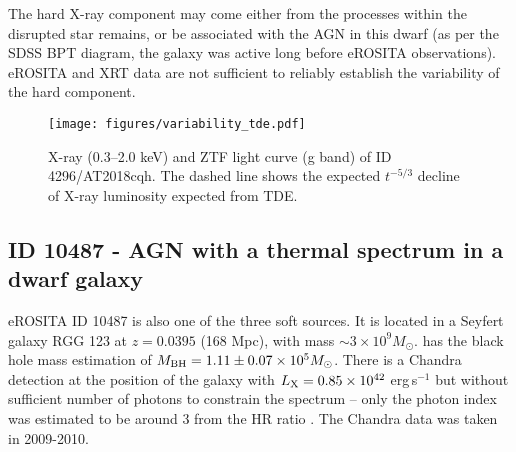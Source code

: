 \documentclass[fleqn,usenatbib]{mnras}
\newcommand{\ergps}{erg\,s$^{-1}$}
\newcommand{\msun}{M_\odot}
\newcommand{\sbyk}[1]{\textcolor{OliveGreen}{{SB: \bf||#1||}}}
\begin{document}


The hard X-ray component may come either from the processes within the disrupted star remains, or be associated with the AGN in this dwarf (as per the SDSS BPT diagram, the galaxy was active long before eROSITA observations). eROSITA and XRT data are not sufficient  to reliably establish the variability of the hard component.




\begin{figure}
    \texttt{[image: figures/variability\_tde.pdf]}
    \caption[X-ray light curve of a TDE candidate in a dwarf galaxy.]{X-ray (0.3--2.0 keV) and ZTF light curve (g band) of ID 4296/AT2018cqh. The dashed line shows the expected $t^{-5/3}$ decline of X-ray luminosity expected from TDE.}
    \label{fig:variability-tde}
\end{figure}


\subsection{ID 10487 -  AGN with a thermal spectrum in a dwarf galaxy }
\label{sect:indiv:soft_agn}
eROSITA ID 10487 is also one of the  three soft sources. It is located in a Seyfert galaxy RGG 123 at $z=0.0395$ (168 Mpc), with mass $\sim3\times10^9 \msun$.  \citealt{Chilingarian2018} has the black hole mass estimation of $M_{\rm BH}=1.11\pm0.07 \times 10^5 \msun$. There is a Chandra detection at the position of the galaxy with $L_{\rm X}=0.85\times10^{42}$ \ergps \citep{Greene2007, Dong2012, Baldassare2017} but without sufficient number of photons to constrain the spectrum -- only the photon index was estimated to be around 3 from the HR ratio \citep{Baldassare2017}. The Chandra data was taken in 2009-2010.
\end{document}
